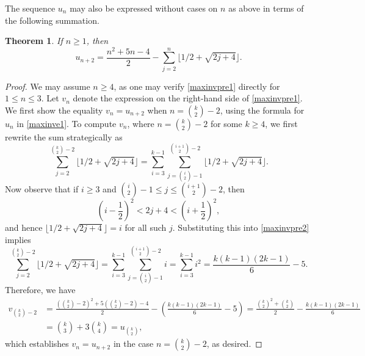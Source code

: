 \documentclass[11pt,a4paper]{article}
\newtheorem{theorem}{Theorem}[section]
\begin{document}
The sequence $u_n$ may also be expressed without cases on $n$ as above in terms of the following summation.

\begin{theorem}\label{maxinvpr}
If $n \geq 1$, then
\begin{equation}\label{maxinvpre1}
u_{n+2}=\frac{n^2+5n-4}{2}-\sum_{j=2}^n\lfloor 1/2+\sqrt{2j+4}\rfloor.
\end{equation}
\end{theorem}
\begin{proof}
We may assume $n \geq 4$, as one may verify \eqref{maxinvpre1} directly for $1 \leq n \leq 3$.  Let $v_n$ denote the expression on the right-hand side of \eqref{maxinvpre1}.  We first show the equality $v_n=u_{n+2}$ when $n=\binom{k}{2}-2$, using the formula for $u_n$ in \eqref{maxinve1}.  To compute $v_n$, where $n=\binom{k}{2}-2$ for some $k \geq 4$, we first rewrite the sum strategically as
\begin{equation}\label{maxinvpre2}
\sum_{j=2}^{\binom{k}{2}-2}\lfloor 1/2+\sqrt{2j+4}\rfloor=\sum_{i=3}^{k-1}\sum_{j=\binom{i}{2}-1}^{\binom{i+1}{2}-2}\lfloor 1/2+\sqrt{2j+4}\rfloor.
\end{equation}
Now observe that if $i \geq 3$ and $\binom{i}{2}-1 \leq j \leq \binom{i+1}{2}-2$, then
$$\left(i-\frac{1}{2}\right)^2 < 2j+4 < \left(i+\frac{1}{2}\right)^2,$$
and hence $\lfloor 1/2+\sqrt{2j+4}\rfloor=i$ for all such $j$. Substituting this into \eqref{maxinvpre2} implies
$$\sum_{j=2}^{\binom{k}{2}-2}\lfloor 1/2+\sqrt{2j+4}\rfloor=\sum_{i=3}^{k-1}\sum_{j=\binom{i}{2}-1}^{\binom{i+1}{2}-2} i=\sum_{i=3}^{k-1}i^2=\frac{k(k-1)(2k-1)}{6}-5.$$
Therefore, we have
\begin{align*}
v_{\binom{k}{2}-2}&=\frac{(\binom{k}{2}-2)^2+5(\binom{k}{2}-2)-4}{2}-\left(\frac{k(k-1)(2k-1)}{6}-5\right)=\frac{\binom{k}{2}^2+\binom{k}{2}}{2}-\frac{k(k-1)(2k-1)}{6}\\
&=\binom{k}{3}+3\binom{k}{4}=u_{\binom{k}{2}},
\end{align*}
which establishes $v_n=u_{n+2}$ in the case $n=\binom{k}{2}-2$, as desired.


\end{proof}
\end{document}
